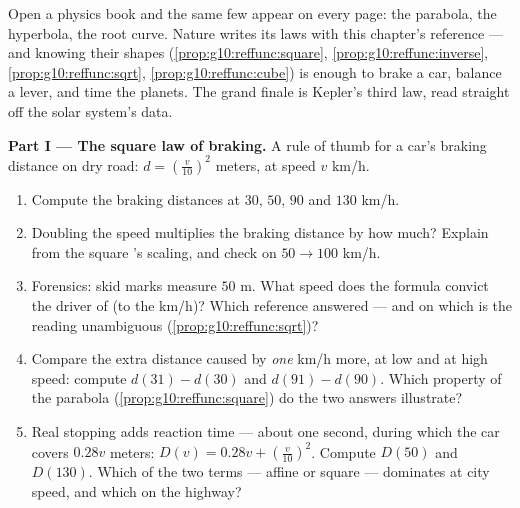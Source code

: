 \begin{problem}
\label{pb:g10:reffunc:1}
Open a physics book and the same few  appear on every page:
the parabola, the hyperbola, the root curve. Nature writes its
laws with this chapter's reference  --- and knowing
their shapes (\cref{prop:g10:reffunc:square},
\cref{prop:g10:reffunc:inverse}, \cref{prop:g10:reffunc:sqrt},
\cref{prop:g10:reffunc:cube}) is enough to brake a car, balance a
lever, and time the planets. The grand finale is Kepler's third
law, read straight off the solar system's data.

\medskip
\noindent\textbf{Part I --- The square law of braking.}
A rule of thumb for a car's braking distance on dry road:
$d = \left(\frac{v}{10}\right)^{2}$ meters, at speed $v$ km/h.
\begin{enumerate}
  \item Compute the braking distances at $30$, $50$, $90$ and
        $130$ km/h.
  \item Doubling the speed multiplies the braking distance by
        how much? Explain from the square 's scaling,
        and check on $50 \to 100$ km/h.
  \item Forensics: skid marks measure $50$ m. What speed does
        the formula convict the driver of (to the km/h)? Which
        reference  answered --- and on which  is
        the reading unambiguous
        (\cref{prop:g10:reffunc:sqrt})?
  \item Compare the extra distance caused by \emph{one} km/h
        more, at low and at high speed: compute
        $d(31) - d(30)$ and $d(91) - d(90)$. Which property of
        the parabola (\cref{prop:g10:reffunc:square}) do the two
        answers illustrate?
  \item Real stopping adds reaction time --- about one second,
        during which the car covers $0.28v$ meters:
        $D(v) = 0.28v + \left(\frac{v}{10}\right)^2$. Compute
        $D(50)$ and $D(130)$. Which of the two terms --- affine
        or square --- dominates at city speed, and which on the
        highway?
\end{enumerate}


\end{problem}
